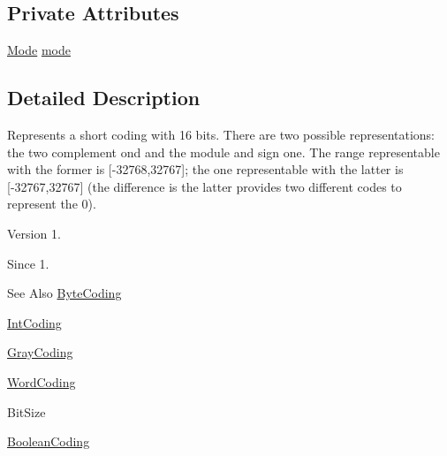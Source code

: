\subsection*{Private Attributes}
\begin{DoxyCompactItemize}
\item 
\hyperlink{enumjenes_1_1chromosome_1_1codings_1_1_short_coding_1_1_mode}{Mode} \hyperlink{classjenes_1_1chromosome_1_1codings_1_1_short_coding_a39b438917e13117e9f68757a40f907c2}{mode}
\end{DoxyCompactItemize}


\subsection{Detailed Description}
Represents a short coding with 16 bits. There are two possible representations\-: the two complement ond and the module and sign one. The range representable with the former is \mbox{[}-\/32768,32767\mbox{]}; the one representable with the latter is \mbox{[}-\/32767,32767\mbox{]} (the difference is the latter provides two different codes to represent the 0).

\begin{DoxyVersion}{Version}
1. 
\end{DoxyVersion}
\begin{DoxySince}{Since}
1.
\end{DoxySince}
\begin{DoxySeeAlso}{See Also}
\hyperlink{classjenes_1_1chromosome_1_1codings_1_1_byte_coding}{Byte\-Coding} 

\hyperlink{classjenes_1_1chromosome_1_1codings_1_1_int_coding}{Int\-Coding} 

\hyperlink{classjenes_1_1chromosome_1_1codings_1_1_gray_coding}{Gray\-Coding} 

\hyperlink{classjenes_1_1chromosome_1_1codings_1_1_word_coding}{Word\-Coding} 

Bit\-Size 

\hyperlink{classjenes_1_1chromosome_1_1codings_1_1_boolean_coding}{Boolean\-Coding} 
\end{DoxySeeAlso}


